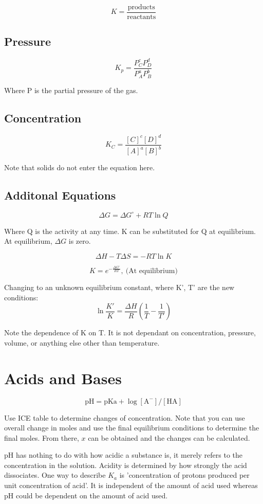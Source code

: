 \documentclass{article}
\begin{document}
\[
K = \frac{\text{products}}{\text{reactants}}
\]

\subsection{Pressure}

\[
K_p= \frac{P_C^c P_D^d}{P_A^a P_B^b}
\]

Where P is the partial pressure of the gas.

\subsection{Concentration}

\[
K_C = \frac{[C]^c [D]^d}{[A]^a [B]^b}
\]

Note that solids do not enter the equation here.

\subsection{Additonal Equations}
\[
\Delta G = \Delta G^{\circ} + RT \ln Q
\]

Where Q is the activity at any time. K can be substituted for Q at equilibrium. At equilibrium, $\Delta G$ is zero.

\[
\Delta H - T\Delta S = -RT \ln K
\]

\[
K = e^{-\frac{\Delta G^{\circ}}{RT}},\ \text{(At equilibrium)}
\]


Changing to an unknown equilibrium constant, where K', T' are the new conditions:
\[
\ln \frac{K'}{K} = \frac{\Delta H}{R} (\frac{1}{T} - \frac{1}{T'})
\]

Note the dependence of K on T. It is not dependant on concentration, pressure, volume, or anything else other than temperature.

\section{Acids and Bases}

\[
\text{pH} = \text{pKa} + \log[\text{A}^-]/[\text{HA}]
\]

Use ICE table to determine changes of concentration. Note that you can use overall change in moles and use the final equilibrium conditions to determine the final moles. From there, $x$ can be obtained and the changes can be calculated.

pH has nothing to do with how acidic a substance is, it merely refers to the concentration in the solution. Acidity is determined by how strongly the acid dissociates. One way to describe $K_a$ is 'concentration of protons produced per unit concentration of acid'. It is independent of the amount of acid used whereas pH could be dependent on the amount of acid used.
\end{document}
